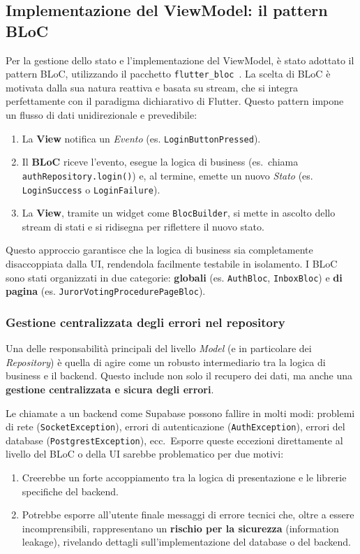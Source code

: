 \subsection{Implementazione del ViewModel: il pattern BLoC}\label{subsec:implementazione-del-viewmodel:-il-pattern-bloc}
Per la gestione dello stato e l'implementazione del ViewModel, è stato adottato il pattern BLoC, utilizzando il pacchetto \texttt{flutter\_bloc}~\cite{bloc_docs}.
La scelta di BLoC è motivata dalla sua natura reattiva e basata su stream, che si integra perfettamente con il paradigma dichiarativo di Flutter.
Questo pattern impone un flusso di dati unidirezionale e prevedibile:
\begin{enumerate}
    \item La \textbf{View} notifica un \emph{Evento} (es. \texttt{LoginButtonPressed}).
    \item Il \textbf{BLoC} riceve l'evento, esegue la logica di business (es.\ chiama \texttt{authRepository.login()}) e, al termine, emette un nuovo \emph{Stato} (es. \texttt{LoginSuccess} o \texttt{LoginFailure}).
    \item La \textbf{View}, tramite un widget come \texttt{BlocBuilder}, si mette in ascolto dello stream di stati e si ridisegna per riflettere il nuovo stato.
\end{enumerate}
Questo approccio garantisce che la logica di business sia completamente disaccoppiata dalla UI, rendendola facilmente testabile in isolamento.
I BLoC sono stati organizzati in due categorie: \textbf{globali} (es. \texttt{AuthBloc}, \texttt{InboxBloc}) e \textbf{di pagina} (es. \texttt{JurorVotingProcedurePageBloc}).

\subsubsection{Gestione centralizzata degli errori nel repository}
Una delle responsabilità principali del livello \emph{Model} (e in particolare dei \emph{Repository}) è quella di agire come un robusto intermediario tra la logica di business e il backend.
Questo include non solo il recupero dei dati, ma anche una \textbf{gestione centralizzata e sicura degli errori}.

Le chiamate a un backend come Supabase possono fallire in molti modi: problemi di rete (\texttt{SocketException}), errori di autenticazione (\texttt{AuthException}), errori del database (\texttt{PostgrestException}), ecc.\ Esporre queste eccezioni direttamente al livello del BLoC o della UI sarebbe problematico per due motivi:
\begin{enumerate}
    \item Creerebbe un forte accoppiamento tra la logica di presentazione e le librerie specifiche del backend.
    \item Potrebbe esporre all'utente finale messaggi di errore tecnici che, oltre a essere incomprensibili, rappresentano un \textbf{rischio per la sicurezza} (information leakage), rivelando dettagli sull'implementazione del database o del backend.
\end{enumerate}

